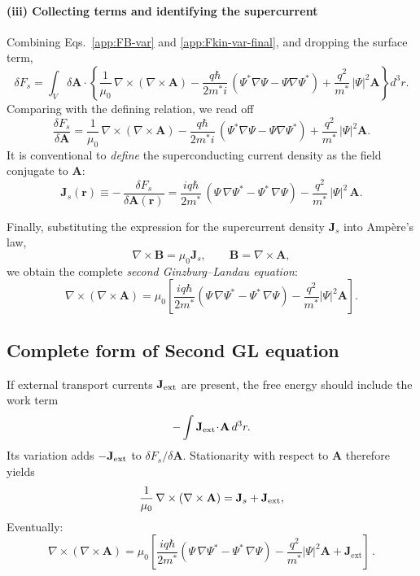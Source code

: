 \paragraph{(iii) Collecting terms and identifying the supercurrent}
Combining Eqs.~\eqref{app:FB-var} and \eqref{app:Fkin-var-final}, and dropping the surface term,
\begin{equation}
\delta F_s
= \int_V \delta\mathbf A\cdot
\left\{
\frac{1}{\mu_0}\,\nabla\times(\nabla\times\mathbf A)
- \frac{q\hbar}{2m^* i}\,(\Psi^*\nabla\Psi - \Psi\nabla\Psi^*)
+ \frac{q^2}{m^*}\,|\Psi|^2 \mathbf A
\right\} d^3r .
\label{app:deltaFs-collect}
\end{equation}
Comparing with the defining relation, we read off
\begin{equation}
\boxed{
\frac{\delta F_s}{\delta \mathbf A}
= \frac{1}{\mu_0}\,\nabla\times(\nabla\times\mathbf A)
- \frac{q\hbar}{2m^* i}\,(\Psi^*\nabla\Psi - \Psi\nabla\Psi^*)
+ \frac{q^2}{m^*}\,|\Psi|^2 \mathbf A .
}
\label{app:dFs-dA}
\end{equation}
It is conventional to \emph{define} the superconducting current density as the field
conjugate to \(\mathbf A\):
\begin{equation}
\boxed{
\mathbf J_s(\mathbf r) \equiv
-\,\frac{\delta F_s}{\delta \mathbf A(\mathbf r)}
=
\frac{i q \hbar}{2 m^*}\,(\Psi\,\nabla\Psi^* - \Psi^*\,\nabla\Psi)
- \frac{q^2}{m^*}\,|\Psi|^2\,\mathbf A .
}
\label{app:Js}
\end{equation}

Finally, substituting the expression for the supercurrent density
\(\mathbf{J}_s\) into Ampère’s law,
\[
\nabla \times \mathbf{B} = \mu_0 \mathbf{J}_s ,
\qquad \mathbf{B} = \nabla \times \mathbf{A},
\]
we obtain the complete \textit{second Ginzburg--Landau equation}:
\begin{equation}
\boxed{
\nabla \times (\nabla \times \mathbf{A})
= \mu_0
\left[
\frac{i q \hbar}{2 m^*}
(\Psi\,\nabla\Psi^* - \Psi^*\,\nabla\Psi)
- \frac{q^2}{m^*}|\Psi|^2\mathbf{A}
\right].
}
\label{eq:second_GL_final}
\end{equation}

\subsection*{ Complete form of Second GL equation}
If external transport currents \(\mathbf J_{\rm ext}\) are present, the free energy
should include the work term \[-\int \mathbf J_{\rm ext}\!\cdot\!\mathbf A\,d^3r.\]
Its variation adds \(-\mathbf J_{\rm ext}\) to \(\delta F_s/\delta\mathbf A\).
Stationarity with respect to $\mathbf A$ therefore yields
\[
\frac{1}{\mu_0}\,\nabla\times(\nabla\times\mathbf A)
= \mathbf J_s + \mathbf J_{\rm ext},
\]
Eventually:
\begin{equation}
\boxed{
\nabla \times (\nabla \times \mathbf{A})
= \mu_0
\left[
\frac{i q \hbar}{2 m^*}
(\Psi\,\nabla\Psi^* - \Psi^*\,\nabla\Psi)
- \frac{q^2}{m^*}|\Psi|^2\mathbf{A}
+ \mathbf{J}_{\text{ext}}
\right]
}\,.
\label{eq:second_GL_final}
\end{equation}


